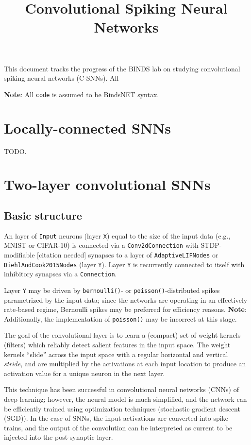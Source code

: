 \documentclass{article}
\title{Convolutional Spiking Neural Networks}
\begin{document}
\maketitle

This document tracks the progress of the BINDS lab on studying convolutional spiking neural networks (C-SNNs). All 

\textbf{Note}: All \texttt{code} is assumed to be BindsNET syntax.

\section{Locally-connected SNNs}

TODO.

\section{Two-layer convolutional SNNs}

\subsection{Basic structure}

An layer of \texttt{Input} neurons (layer \texttt{X}) equal to the size of the input data (e.g., MNIST or CIFAR-10) is connected via a \texttt{Conv2dConnection} with STDP-modifiable [citation needed] synapses to a layer of \texttt{AdaptiveLIFNodes} or \texttt{DiehlAndCook2015Nodes} (layer \texttt{Y}). Layer \texttt{Y} is recurrently connected to itself with inhibitory synapses via a \texttt{Connection}.

Layer \texttt{Y} may be driven by \texttt{bernoulli()}- or \texttt{poisson()}-distributed spikes parametrized by the input data; since the networks are operating in an effectively rate-based regime, Bernoulli spikes may be preferred for efficiency reasons. \textbf{Note}: Additionally, the implementation of \texttt{poisson()} may be incorrect at this stage.

The goal of the convolutional layer is to learn a (compact) set of weight kernels (filters) which reliably detect salient features in the input space. The weight kernels ``slide'' across the input space with a regular horizontal and vertical \textit{stride}, and are multiplied by the activations at each input location to produce an activation value for a unique neuron in the next layer.

This technique has been successful in convolutional neural networks (CNNs) of deep learning; however, the neural model is much simplified, and the network can be efficiently trained using optimization techniques (stochastic gradient descent (SGD)). In the case of SNNs, the input activations are converted into spike trains, and the output of the convolution can be interpreted as current to be injected into the post-synaptic layer. 
\end{document}

